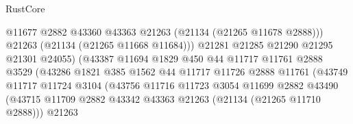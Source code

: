 \begin{lexlean}{RustCore}
\begin{coremodule}
                                            @11677
                                            @2882
                                            @43360
                                            @43363
                                            @21263
                                            (@21134 (@21265 @11678 @2888)))
                                          @21263
                                          (@21134 (@21265 @11668 @11684)))
                                        @21281
                                        @21285
                                        @21290
                                        @21295
                                        @21301
                                        @24055)
                                      (@43387
                                        @11694
                                        @1829
                                        @450
                                        @44
                                        @11717
                                        @11761
                                        @2888
                                        @3529
                                        (@43286
                                          @1821
                                          @385
                                          @1562
                                          @44
                                          @11717
                                          @11726
                                          @2888
                                          @11761
                                          (@43749
                                            @11717
                                            @11724
                                            @3104
                                            (@43756
                                              @11716
                                              @11723
                                              @3054
                                              @11699
                                              @2882
                                              @43490
                                              (@43715
                                                @11709
                                                @2882
                                                @43342
                                                @43363
                                                @21263
                                                (@21134 (@21265 @11710 @2888)))
                                              @21263

\end{coremodule}
\end{lexlean}
